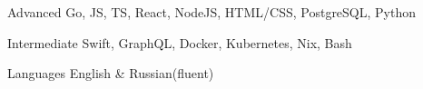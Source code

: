
\begin{cvskills}

  \cvskill
    {Advanced}
    {Go, JS, TS, React, NodeJS, HTML/CSS, PostgreSQL, Python}

    \cvskill
    {Intermediate}
    {Swift, GraphQL, Docker, Kubernetes, Nix, Bash}

  \cvskill
    {Languages}
    {English \& Russian(fluent)}

\end{cvskills}
